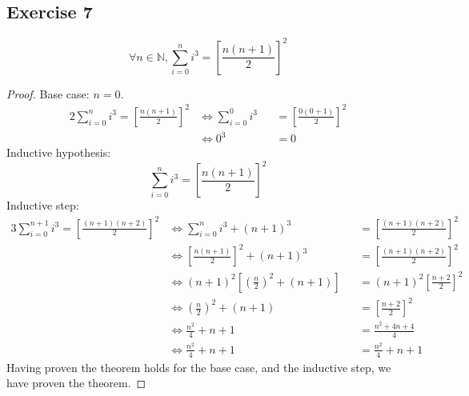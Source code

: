 \subsection{Exercise 7}
\begin{lemma}
	\begin{equation*}
		\forall n \in \mathbb{N},\sum_{i=0}^{n}{i^3}={\left[\frac{n(n+1)}{2}\right]}^2
	\end{equation*}
\end{lemma}
\begin{proof}
	Base case: $n=0$.
	\begin{alignat*}{2}
		\sum_{i=0}^{n}{i^3}={\left[\frac{n(n+1)}{2}\right]}^2
		&\iff \sum_{i=0}^{0}{i^3} && ={\left[\frac{0(0+1)}{2}\right]}^2 \\
		&\iff 0^3 && =0
	\end{alignat*}
	Inductive hypothesis:
	\begin{equation*}
		\sum_{i=0}^{n}{i^3}={\left[\frac{n(n+1)}{2}\right]}^2
	\end{equation*}
	Inductive step:
	\begin{alignat*}{3}
		\sum_{i=0}^{n+1}{i^3}={\left[\frac{(n+1)(n+2)}{2}\right]}^2
		&\iff \sum_{i=0}^{n}{i^3} +(n+1)^3                               &&= {\left[\frac{(n+1)(n+2)}{2}\right]}^2 \\
		&\iff {\left[\frac{n(n+1)}{2}\right]}^2 +(n+1)^3                 &&= {\left[\frac{(n+1)(n+2)}{2}\right]}^2 \\
		&\iff (n+1)^2 \left[ {\left(\frac{n}{2}\right)}^2 +(n+1) \right] &&= (n+1)^2{\left[\frac{n+2}{2}\right]}^2 \\
		&\iff {\left(\frac{n}{2}\right)}^2 +(n+1)                        &&= {\left[\frac{n+2}{2}\right]}^2 \\
		&\iff \frac{n^2}{4}+n+1                                          &&= \frac{n^2+4n+4}{4} \\
		&\iff \frac{n^2}{4}+n+1                                          &&= \frac{n^2}{4}+n+1
	\end{alignat*}
	Having proven the theorem holds for the base case, and the inductive step, we have proven the theorem.
\end{proof}
\pagebreak
